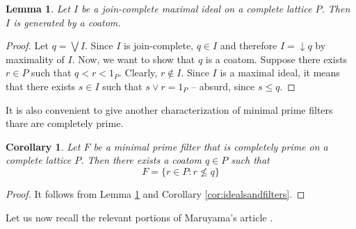\documentclass{article}
\theoremstyle{plain}
\newtheorem{proposition}[theorem]{Proposition}
\newtheorem{lemma}[theorem]{Lemma}
\newtheorem{corollary}[theorem]{Corollary}
\theoremstyle{definition}
\theoremstyle{remark}
\newcommand{\0}{\mathbbm 0}
\newcommand{\1}{\mathbbm 1}
\newcommand{\2}{\mathbbm 2}
\begin{document}


\begin{lemma}
\label{lemma:ideal&coatom}
    Let \(I\) be a join-complete maximal ideal  on a complete lattice \(P\). Then \(I\) is generated by a coatom. 
\end{lemma}
\begin{proof}
    Let \(q=\bigvee I\). Since \(I\) is join-complete, \(q \in I\) and therefore \(I=\downarrow q\) by maximality of \(I\). Now, we want to show that \(q \) is a coatom. Suppose there exists \(r \in P\) such that \(q < r < 1_P\). Clearly, \(r \notin I\). Since \(I\) is a maximal ideal, it means that there exists \(s \in I\) such that \(s \vee r=1_P\) -- absurd, since \(s \leq q\). 
\end{proof}
It is also convenient to give another characterization of minimal prime filters thare are completely prime. 

\begin{corollary}
\label{cor:minprimcompprime&coatom}
    Let \( F \) be a minimal prime filter that is completely prime on a complete lattice \(P\). Then there exists a coatom \(q \in P\) such that  \[ F = \{r \in P: r \not \leq q \} \]
\end{corollary}

\begin{proof}
It follows from Lemma \ref{lemma:ideal&coatom} and Corollary \ref{cor:idealsandfilters}. 
\end{proof}




Let us now recall the relevant portions of Maruyama's article \cite{maruyama}.
\end{document}
